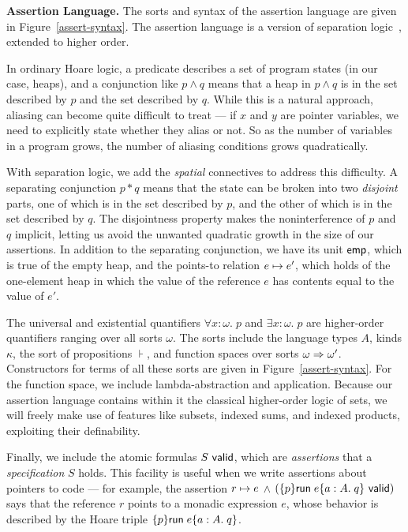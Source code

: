 \documentclass[natbib]{sigplanconf}
\begin{document}
\textbf{Assertion Language.} The sorts and syntax of the assertion
language are given in Figure~\ref{assert-syntax}. The assertion
language is a version of separation logic~\cite{sep-logic}, extended
to higher order.

In ordinary Hoare logic, a predicate describes a set of program states
(in our case, heaps), and a conjunction like $p \land q$ means that a
heap in $p \land q$ is in the set described by $p$ and the set described
by $q$. While this is a natural approach, aliasing can become quite
difficult to treat --- if $x$ and $y$ are pointer variables, we need
to explicitly state whether they alias or not. So as the number of
variables in a program grows, the number of aliasing conditions grows
quadratically.

With separation logic, we add the \emph{spatial} connectives to
address this difficulty. A separating conjunction $p * q$ means that
the state can be broken into two \emph{disjoint} parts, one of which
is in the set described by $p$, and the other of which is in the
set described by $q$. The disjointness property makes the
noninterference of $p$ and $q$ implicit, letting us avoid the unwanted
quadratic growth in the size of our assertions. In addition to the
separating conjunction, we have its unit $\mathsf{emp}$, which is true of the
empty heap, and the points-to relation $e \mapsto e'$, which holds
of the one-element heap in which the value of the reference $e$ has 
contents equal to the value of $e'$. 

The universal and existential quantifiers $\forall x:\omega.\;p$ and
$\exists x:\omega.\;p$ are higher-order quantifiers ranging over all
sorts $\omega$. The sorts include the language types $A$, kinds $\kappa$, the sort of
propositions $\assert$, and function spaces over sorts $\omega \Rightarrow
\omega'$. Constructors for terms of all these sorts are
given in Figure~\ref{assert-syntax}. For the function space, we
include lambda-abstraction and application. Because our assertion
language contains within it the classical higher-order logic of sets,
we will freely make use of features like subsets, indexed sums, and
indexed products, exploiting their definability.

Finally, we include the atomic formulas ${S}\mbox{\textsf{{ valid}}}$, which are
\emph{assertions} that a \emph{specification} $S$ holds. This facility
is useful when we write assertions about pointers to code --- for
example, the assertion $r \mapsto e$ $\land$
$({\{{p}\}{\mbox{\textsf{{run}}}\;{e}}\{{a:A}.\;{q}\}}\mbox{\textsf{{ valid}}})$ says that the reference $r$ points
to a monadic expression $e$, whose behavior is described by the Hoare
triple $\{{p}\}{\mbox{\textsf{{run}}}\;{e}}\{{a:A}.\;{q}\}$.
\end{document}
